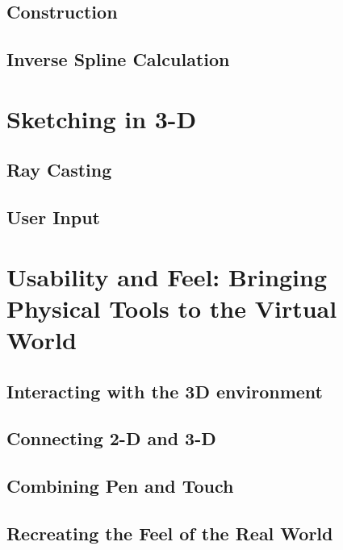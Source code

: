 \documentclass{article}
\begin{document}
\subsection{Construction}

\subsection{Inverse Spline Calculation}

\section{Sketching in 3-D}

\subsection{Ray Casting}

\subsection{User Input}

\section{Usability and Feel: Bringing Physical Tools to the Virtual World}

\subsection{Interacting with the 3D environment}

\subsection{Connecting 2-D and 3-D}

\subsection{Combining Pen and Touch}

\subsection{Recreating the Feel of the Real World}
 
\end{document}
